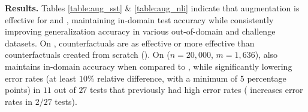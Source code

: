 


\textbf{Results.}
Tables \ref{table:aug_sst} \& \ref{table:aug_nli} indicate that \sysname augmentation is effective for \sst and \nli, maintaining in-domain test accuracy while consistently improving generalization accuracy in various out-of-domain and challenge datasets. On \nli, \sysname counterfactuals are as effective or more effective than counterfactuals created from scratch (\mcad).
On \qqp ($n=20,000$, $m=1,636$), \maug also maintains in-domain accuracy when compared to \mcomp, while significantly lowering error rates (at least $10\%$ relative difference, with a minimum of $5$ percentage points) in $11$ out of $27$ tests that previously had high error rates (\sysname{} increases error rates in $2/27$ tests).

